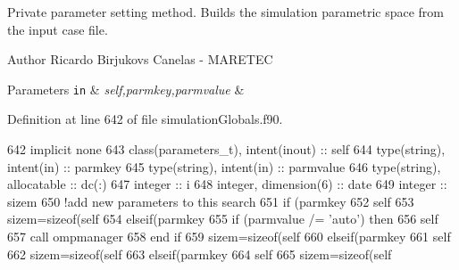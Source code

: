 Private parameter setting method. Builds the simulation parametric space from the input case file. 

\begin{DoxyAuthor}{Author}
Ricardo Birjukovs Canelas -\/ M\+A\+R\+E\+T\+EC 
\end{DoxyAuthor}

\begin{DoxyParams}[1]{Parameters}
\mbox{\tt in}  & {\em self,parmkey,parmvalue} & \\
\hline
\end{DoxyParams}


Definition at line 642 of file simulation\+Globals.\+f90.


\begin{DoxyCode}
642     \textcolor{keywordtype}{implicit none}
643     \textcolor{keywordtype}{class}(parameters\_t), \textcolor{keywordtype}{intent(inout)} :: self
644     \textcolor{keywordtype}{type}(string), \textcolor{keywordtype}{intent(in)} :: parmkey
645     \textcolor{keywordtype}{type}(string), \textcolor{keywordtype}{intent(in)} :: parmvalue
646     \textcolor{keywordtype}{type}(string), \textcolor{keywordtype}{allocatable} :: dc(:)
647     \textcolor{keywordtype}{integer} :: i
648     \textcolor{keywordtype}{integer}, \textcolor{keywordtype}{dimension(6)} :: date
649     \textcolor{keywordtype}{integer} :: sizem
650     \textcolor{comment}{!add new parameters to this search}
651     \textcolor{keywordflow}{if} (parmkey%
652         self%
653         sizem=sizeof(self%
654     \textcolor{keywordflow}{elseif}(parmkey%
655         \textcolor{keywordflow}{if} (parmvalue /= \textcolor{stringliteral}{'auto'}) \textcolor{keywordflow}{then}
656             self%
657             \textcolor{keyword}{call }ompmanager%
658 \textcolor{keywordflow}{        end if}
659         sizem=sizeof(self%
660     \textcolor{keywordflow}{elseif}(parmkey%
661         self%
662         sizem=sizeof(self%
663     \textcolor{keywordflow}{elseif}(parmkey%
664         self%
665         sizem=sizeof(self%

\end{DoxyCode}
